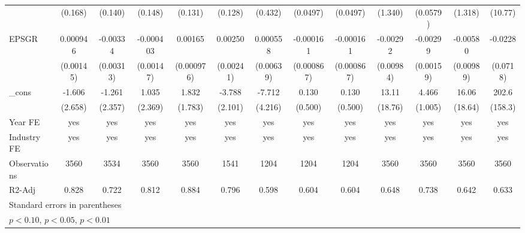 \begin{table}[htbp]
\begin{tabular}{l*{12}{c}}
                    &     (0.168)         &     (0.140)         &     (0.148)         &     (0.131)         &     (0.128)         &     (0.432)         &    (0.0497)         &    (0.0497)         &     (1.340)         &    (0.0579)         &     (1.318)         &     (10.77)         \\
EPSGR               &    0.000946         &    -0.00334         &   -0.000403         &     0.00165         &     0.00250         &    0.000558         &   -0.000161         &   -0.000161         &    -0.00292         &    -0.00299\sym{*}  &    -0.00580         &     -0.0228         \\
                    &   (0.00145)         &   (0.00313)         &   (0.00147)         &  (0.000976)         &   (0.00241)         &   (0.00639)         &  (0.000867)         &  (0.000867)         &   (0.00984)         &   (0.00159)         &   (0.00989)         &    (0.0718)         \\
\_cons              &      -1.606         &      -1.261         &       1.035         &       1.832         &      -3.788\sym{*}  &      -7.712\sym{*}  &       0.130         &       0.130         &       13.11         &       4.466\sym{***}&       16.06         &       202.6         \\
                    &     (2.658)         &     (2.357)         &     (2.369)         &     (1.783)         &     (2.101)         &     (4.216)         &     (0.500)         &     (0.500)         &     (18.76)         &     (1.005)         &     (18.64)         &     (158.3)         \\
\hline
Year FE             &         yes         &         yes         &         yes         &         yes         &         yes         &         yes         &         yes         &         yes         &         yes         &         yes         &         yes         &         yes         \\
Industry FE         &         yes         &         yes         &         yes         &         yes         &         yes         &         yes         &         yes         &         yes         &         yes         &         yes         &         yes         &         yes         \\
Observations        &        3560         &        3534         &        3560         &        3560         &        1541         &        1204         &        1204         &        1204         &        3560         &        3560         &        3560         &        3560         \\
R2-Adj              &       0.828         &       0.722         &       0.812         &       0.884         &       0.796         &       0.598         &       0.604         &       0.604         &       0.648         &       0.738         &       0.642         &       0.633         \\
\hline\hline
\multicolumn{13}{l}{\footnotesize Standard errors in parentheses}\\
\multicolumn{13}{l}{\footnotesize \sym{*} \(p<0.10\), \sym{**} \(p<0.05\), \sym{***} \(p<0.01\)}\\
\end{tabular}
\end{table}
